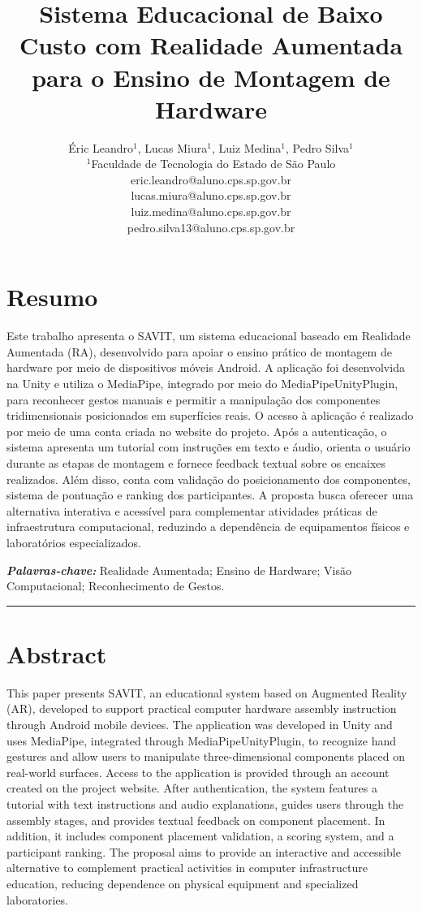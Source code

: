 \documentclass[11pt,a4paper]{article}
\title{
Sistema Educacional de Baixo Custo com Realidade Aumentada para o Ensino de Montagem de Hardware
}
\author{
Éric Leandro$^{1}$, Lucas Miura$^{1}$, Luiz Medina$^{1}$, Pedro Silva$^{1}$\\[0.3cm]
\small $^{1}$Faculdade de Tecnologia do Estado de São Paulo\\[0.2cm]
\small eric.leandro@aluno.cps.sp.gov.br\\
\small lucas.miura@aluno.cps.sp.gov.br\\
\small luiz.medina@aluno.cps.sp.gov.br\\
\small pedro.silva13@aluno.cps.sp.gov.br
}
\date{}
\begin{document}
\pagestyle{fancy}

\maketitle
\thispagestyle{fancy}

\section*{Resumo}

Este trabalho apresenta o SAVIT, um sistema educacional baseado em Realidade Aumentada (RA), desenvolvido para apoiar o ensino prático de montagem de hardware por meio de dispositivos móveis Android. A aplicação foi desenvolvida na Unity e utiliza o MediaPipe, integrado por meio do MediaPipeUnityPlugin, para reconhecer gestos manuais e permitir a manipulação dos componentes tridimensionais posicionados em superfícies reais. O acesso à aplicação é realizado por meio de uma conta criada no website do projeto. Após a autenticação, o sistema apresenta um tutorial com instruções em texto e áudio, orienta o usuário durante as etapas de montagem e fornece feedback textual sobre os encaixes realizados. Além disso, conta com validação do posicionamento dos componentes, sistema de pontuação e ranking dos participantes. A proposta busca oferecer uma alternativa interativa e acessível para complementar atividades práticas de infraestrutura computacional, reduzindo a dependência de equipamentos físicos e laboratórios especializados.

\vspace{0.3cm}
\noindent\textit{\textbf{Palavras-chave:}} Realidade Aumentada; Ensino de Hardware; Visão Computacional; Reconhecimento de Gestos.

\vspace{0.5cm}
\noindent\rule{\textwidth}{0.5pt}
\vspace{0.5cm}


\section*{Abstract}

This paper presents SAVIT, an educational system based on Augmented Reality (AR), developed to support practical computer hardware assembly instruction through Android mobile devices. The application was developed in Unity and uses MediaPipe, integrated through MediaPipeUnityPlugin, to recognize hand gestures and allow users to manipulate three-dimensional components placed on real-world surfaces. Access to the application is provided through an account created on the project website. After authentication, the system features a tutorial with text instructions and audio explanations, guides users through the assembly stages, and provides textual feedback on component placement. In addition, it includes component placement validation, a scoring system, and a participant ranking. The proposal aims to provide an interactive and accessible alternative to complement practical activities in computer infrastructure education, reducing dependence on physical equipment and specialized laboratories.
\end{document}

